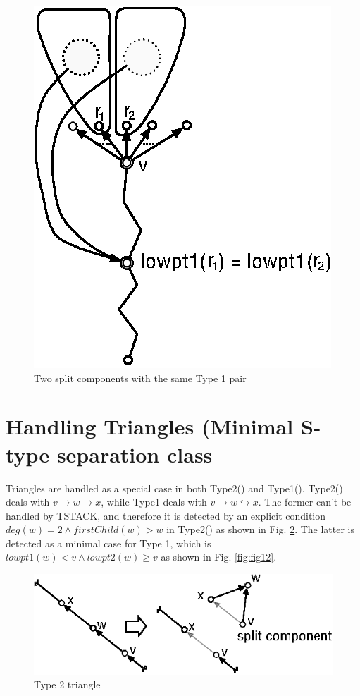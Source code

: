 \documentclass[twoside,twocolumn]{article}
\begin{document}
\begin{figure}[!htb]
\centering
\includegraphics[scale=1.0]{spqr_fig10.eps}
\caption{Two split components with the same Type 1 pair}
\label{fig:fig10}
\end{figure}


\section{Handling Triangles (Minimal S-type separation class}
Triangles are handled as a special case in both {\ttfamily Type2()} and {\ttfamily Type1()}.
{\ttfamily Type2()} deals with $v \rightarrow w \rightarrow x$, while {\ttfamily Type1} deals with $v \rightarrow w \hookrightarrow x$.
The former can't be handled by {\ttfamily TSTACK}, and therefore it is detected
by an explicit condition $deg(w)=2 \wedge firstChild(w) > w$ in {\ttfamily Type2()}
as shown in Fig. \ref{fig:fig11}.
The latter is detected as a minimal case for Type 1, which is
$lowpt1(w) < v \wedge lowpt2(w) \geq v$ as shown in Fig. \ref{fig:fig12}.


\begin{figure}[!htb]
\centering
\includegraphics[scale=1.0]{spqr_fig11.eps}
\caption{Type 2 triangle}
\label{fig:fig11}
\end{figure}
\end{document}
